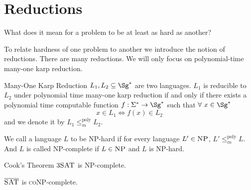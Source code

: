 \section{Reductions}
\begin{question}{}{}
    What does it mean for a problem to be at least as hard as another? 
\end{question}
To relate hardness of one problem to another we introduce the notion of reductions. There are many reductions. We will only focus on polynomial-time many-one karp reduction. 
\begin{Definition}{Many-One Karp Reduction}{}
$L_1,L_2\subseteq\Sg^*$ are two languages. $L_1$ is reducible to $L_2$ under polynomial time many-one karp reduction if and only if there exists a polynomial time computable  function $f:\Sigma^*\to\Sg^*$ such that $\forall\ x\in \Sg^*$ $$x\in L_1\iff f(x)\in L_2$$ and we denote it by $L_1\leq_{m}^{\text{poly}} L_2$. 
\end{Definition}
We call a language $L$ to be \textsc{NP}-hard if for every language $L'\in\textsc{NP}$, $L'\leq_{m}^{\text{poly}}L$. And $L$ is called \textsc{NP}-complete if $L\in\textsc{NP}$ and $L$ is \textsc{NP}-hard. 
\begin{Theorem}{Cook's Theorem}{}
$3\textsc{SAT}$ is \textsc{NP}-complete.
\end{Theorem}
\begin{corolary}{}{}
    $\overline{\textsc{SAT}}$ is \textsc{coNP}-complete. 
\end{corolary}
